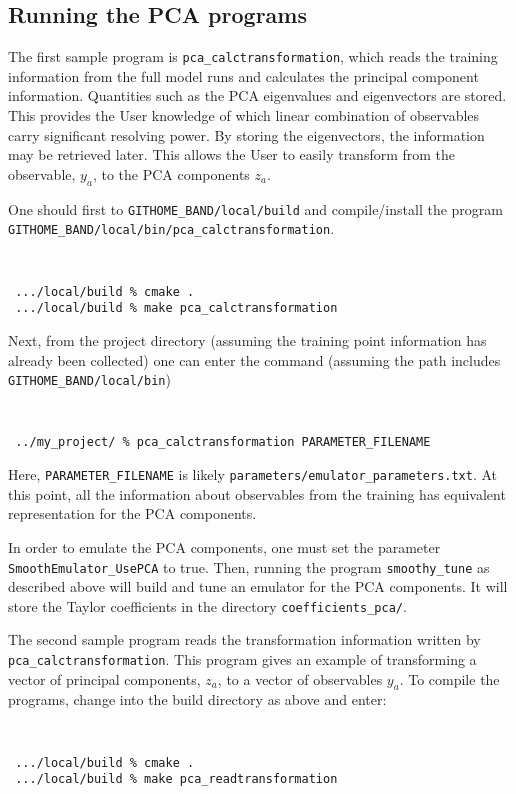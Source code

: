 \documentclass[UserManual.tex]{subfiles}
\begin{document}
\subsection{Running the PCA programs}

The first sample program is {\tt pca\_calctransformation}, which reads the training information from the full model runs and calculates the principal component information. Quantities such as the PCA eigenvalues and eigenvectors are stored. This provides the User knowledge of which linear combination of observables carry significant resolving power. By storing the eigenvectors, the information may be retrieved later. This allows the User to easily transform from the observable, $y_a$, to the PCA components $z_a$. 

One should first to {\tt GITHOME\_BAND/local/build} and compile/install the program\\
{\tt GITHOME\_BAND/local/bin/pca\_calctransformation}.
{\tt
\begin{verbatim}
 .../local/build % cmake .
 .../local/build % make pca_calctransformation
 \end{verbatim}
}
Next, from the project directory (assuming the training point information has already been collected) one can enter the command (assuming the path includes {\tt GITHOME\_BAND/local/bin})
{\tt
\begin{verbatim}
 ../my_project/ % pca_calctransformation PARAMETER_FILENAME
 \end{verbatim}
}
Here, {\tt PARAMETER\_FILENAME} is likely {\tt parameters/emulator\_parameters.txt}. At this point, all the information about observables from the training has equivalent representation for the PCA components.

In order to emulate the PCA components, one must set the parameter {\tt SmoothEmulator\_UsePCA} to true. Then, running the program {\tt smoothy\_tune} as described above will build and tune an emulator for the PCA components. It will store the Taylor coefficients in the directory {\tt coefficients\_pca/}.

The second sample program reads the transformation information written by {\tt pca\_calctransformation}. This program gives an example of transforming a vector of principal components, $z_a$, to a vector of observables $y_a$. To compile the programs, change into the build directory as above and enter:
{\tt
\begin{verbatim}
 .../local/build % cmake .
 .../local/build % make pca_readtransformation
 \end{verbatim}
}
\end{document}
